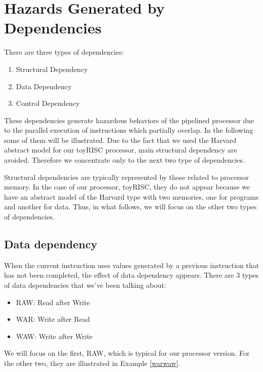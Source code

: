 \section{Hazards Generated by Dependencies}



There are three types of dependencies:
\begin{enumerate}
\item Structural Dependency
\item Data Dependency
\item Control Dependency
\end{enumerate}

These dependencies generate hazardous behaviors of the pipelined processor due to the parallel execution of instructions which partially overlap. In the following some of them will be illustrated. Due to the fact that we used the Harvard abstract model for our toyRISC processor, main structural dependency are avoided. Therefore we concentrate only to the next two type of dependencies.

Structural dependencies are typically represented by those related to processor memory. In the case of our processor, toyRISC, they do not appear because we have an abstract model of the Harvard type with two memories, one for programs and another for data. Thus, in what follows, we will focus on the other two types of dependencies.

\subsection{Data dependency}

When the current instruction uses values generated by a previous instruction that has not been completed, the effect of data dependency appears. There are 3 types of data dependencies that
we’ve been talking about:
\begin{itemize}
\item RAW: Read after Write
\item WAR: Write after Read
\item WAW: Write after Write
\end{itemize}
We will focus on the first, RAW, which is typical for our processor version. For the other two, they are illustrated in Example \ref{warwaw}.


